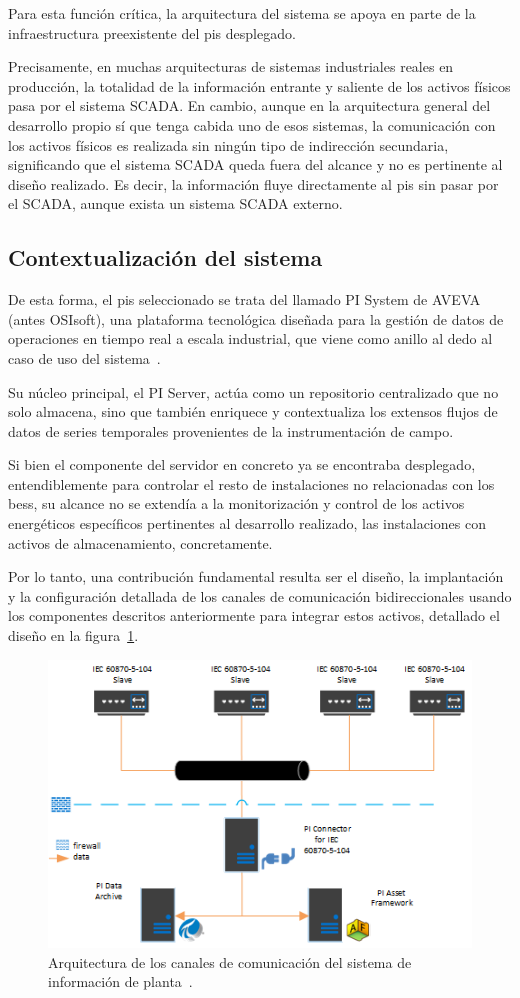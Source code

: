 Para esta función crítica, la arquitectura del sistema se apoya en parte de la infraestructura preexistente del \gls{pis} desplegado.

Precisamente, en muchas arquitecturas de sistemas industriales reales en producción, la totalidad de la información entrante y saliente de los activos físicos pasa por el sistema SCADA\@. En cambio, aunque en la arquitectura general del desarrollo propio sí que tenga cabida uno de esos sistemas, la comunicación con los activos físicos es realizada sin ningún tipo de indirección secundaria, significando que el sistema SCADA queda fuera del alcance y no es pertinente al diseño realizado. Es decir, la información fluye directamente al \gls{pis} sin pasar por el SCADA\@, aunque exista un sistema SCADA externo.

\subsection{Contextualización del sistema}
\label{makereference3.4.1}

De esta forma, el \gls{pis} seleccionado se trata del llamado PI System de AVEVA (antes OSIsoft), una plataforma tecnológica diseñada para la gestión de datos de operaciones en tiempo real a escala industrial, que viene como anillo al dedo al caso de uso del sistema~\cite{aveva2025aveva}.

Su núcleo principal, el PI Server, actúa como un repositorio centralizado que no solo almacena, sino que también enriquece y contextualiza los extensos flujos de datos de series temporales provenientes de la instrumentación de campo.

Si bien el componente del servidor en concreto ya se encontraba desplegado, entendiblemente para controlar el resto de instalaciones no relacionadas con los \gls{bess}, su alcance no se extendía a la monitorización y control de los activos energéticos específicos pertinentes al desarrollo realizado, las instalaciones con activos de almacenamiento, concretamente.

Por lo tanto, una contribución fundamental resulta ser el diseño, la implantación y la configuración detallada de los canales de comunicación bidireccionales usando los componentes descritos anteriormente para integrar estos activos, detallado el diseño en la figura~\ref{fig:sistema-de-informacion-de-planta}.

\begin{figure}
  \centering
  \includegraphics[width=0.5\linewidth]{figures/sistema-de-informacion-de-planta.png}
  \caption{Arquitectura de los canales de comunicación del sistema de información de planta~\cite{aveva2025aveva}.}
  \label{fig:sistema-de-informacion-de-planta}
\end{figure}

